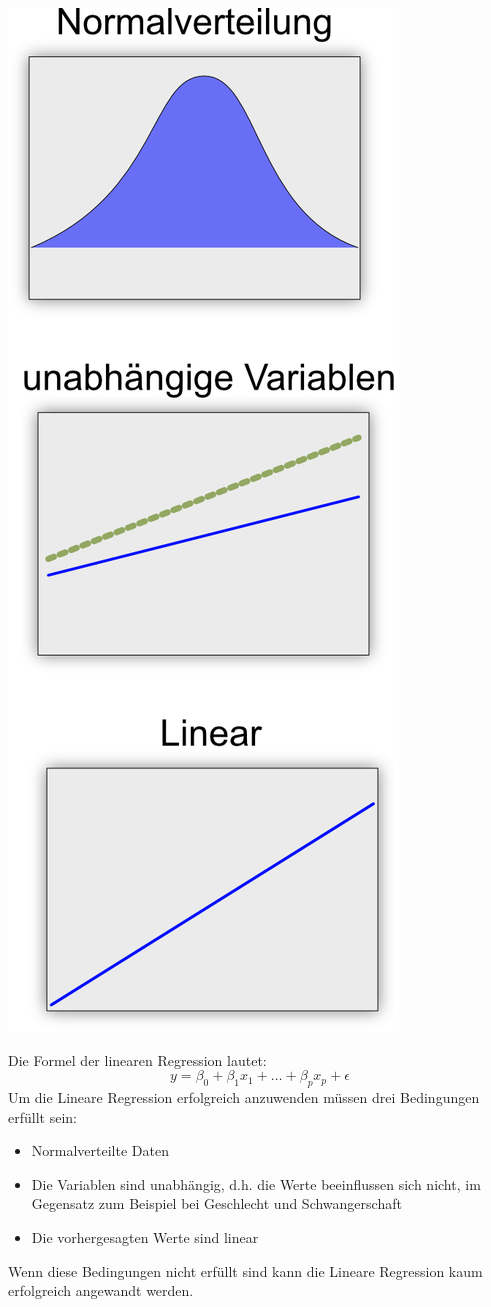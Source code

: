 \documentclass[
  12pt, %
  a4paper, %
  oneside, %
  openany, 
  numbers=noenddot, %
  BCOR=5mm, %
  parskip=half*, %
  thesis, %
]{bfhbook}
\begin{document}
\begin{center}
\begin{minipage}[t]{0.3\linewidth}
\vspace{0pt}
\includegraphics[width=0.6\linewidth]{Bilder/Regressions-Bedingungen.png}
\end{minipage}\hfill
\begin{minipage}[t]{0.65\linewidth}
\vspace{0pt}
Die Formel der linearen Regression lautet: \[y = \beta_0  + \beta_1 x_1 + … + \beta_p x_p + \epsilon\]
Um die Lineare Regression erfolgreich anzuwenden müssen drei Bedingungen erfüllt sein:
\begin{itemize}
	\item Normalverteilte Daten
	\item Die Variablen sind unabhängig, d.h. die Werte beeinflussen sich nicht, im Gegensatz zum Beispiel bei Geschlecht und Schwangerschaft
	\item Die vorhergesagten Werte sind linear
\end{itemize}
Wenn diese Bedingungen nicht erfüllt sind kann die Lineare Regression kaum erfolgreich angewandt werden.
\end{minipage}
\end{center}
\end{document}
